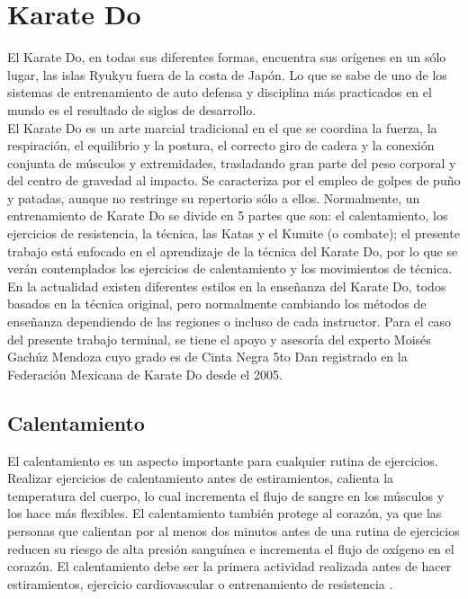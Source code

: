 \section{Karate Do}
\label{sec:Karate-Do}
El Karate Do, en todas sus diferentes formas, encuentra sus orígenes en un sólo lugar, las islas Ryukyu fuera de la costa de Japón. Lo que se sabe de uno de los sistemas de entrenamiento de auto defensa y disciplina más practicados en el mundo es el resultado de siglos de desarrollo. \\

El Karate Do es un arte marcial tradicional en el que se coordina la fuerza, la respiración, el equilibrio y la postura, el correcto giro de cadera y la conexión conjunta de músculos y extremidades, trasladando gran parte del peso corporal y del centro de gravedad al impacto. Se caracteriza por el empleo de golpes de puño y patadas, aunque no restringe su repertorio sólo a ellos. Normalmente, un entrenamiento de Karate Do se divide en 5 partes que son: el calentamiento, los ejercicios de resistencia, la técnica, las Katas y el Kumite (o combate); el presente trabajo está enfocado en el aprendizaje de la técnica del Karate Do, por lo que se verán contemplados los ejercicios de calentamiento y los movimientos de técnica. \\

En la actualidad existen diferentes estilos en la enseñanza del Karate Do, todos basados en la técnica original, pero normalmente cambiando los métodos de enseñanza dependiendo de las regiones o incluso de cada instructor. Para el caso del presente trabajo terminal, se tiene el apoyo y asesoría del experto Moisés Gachúz Mendoza cuyo grado es de Cinta Negra 5to Dan registrado en la Federación Mexicana de Karate Do desde el 2005.
\subsection{Calentamiento}
\label{sec:Calentamiento}
El calentamiento es un aspecto importante para cualquier rutina de ejercicios. Realizar ejercicios de calentamiento antes de estiramientos, calienta la temperatura del cuerpo, lo cual incrementa el flujo de sangre en los músculos y los hace más flexibles. El calentamiento también protege al corazón, ya que las personas que calientan por al menos dos minutos antes de una rutina de ejercicios reducen su riesgo de alta presión sanguínea e incrementa el flujo de oxígeno en el corazón. El calentamiento debe ser la primera actividad realizada antes de hacer estiramientos, ejercicio cardiovascular o entrenamiento de resistencia \cite{Nall}.\\

